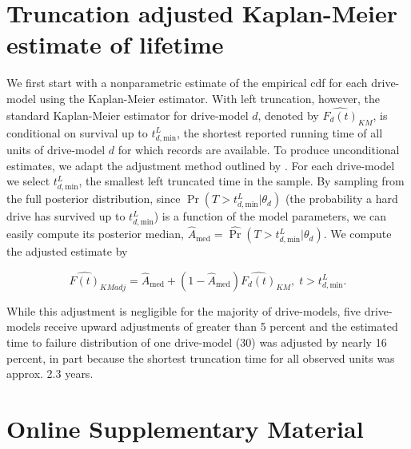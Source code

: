 \documentclass[aap]{imsart}
\begin{document}
\clearpage

\appendix
\section{Truncation adjusted Kaplan-Meier estimate of lifetime}
\label{sec:trunc-adj}
We first start with a nonparametric estimate of the empirical cdf for each drive-model using the Kaplan-Meier estimator.  With left truncation, however, the standard Kaplan-Meier estimator for drive-model $d$, denoted by
$\widehat{F_d(t)}_{KM}$, is conditional on survival up to
$t_{d,\text{min}}^L$, the shortest reported running time of all units
of drive-model $d$ for which records are available. To produce
unconditional estimates, we adapt the adjustment method outlined by \citet[Chapter 11]{meeker}.  For each drive-model we select
$t_{d,\text{min}}^L$, the smallest left truncated time in the sample.
By sampling from the full posterior distribution, since
$\Pr(T>t_{d,\text{min}}^L|\theta_d)$ (the probability a hard drive has
survived up to $t_{d,\text{min}}^L$) is a function of the model
parameters, we can easily compute its posterior median,
$\widehat{A}_{\text{med}} = \widehat{\Pr}(T>t_{d,\text{min}}^L|\theta_d)$. We compute the adjusted estimate by

$$\widehat{F(t)}_{KMadj} = \widehat{A}_{\text{med}} + \left(1 - \widehat{A}_{\text{med}}\right)\widehat{F_d(t)}_{KM},\; t>t_{d,\text{min}}^L.$$

While this adjustment is negligible for the majority of drive-models, five drive-models receive upward adjustments of greater than 5 percent and the estimated time to failure distribution of one drive-model (30) was adjusted by nearly 16 percent, in part because the shortest truncation time for all observed units was approx. 2.3 years.

\section{Online Supplementary Material}
\label{sec:supple}
\begin{supplement}[id=suppA]
\end{supplement}

\begin{supplement}[id=suppB]
\end{supplement}



\end{document}
